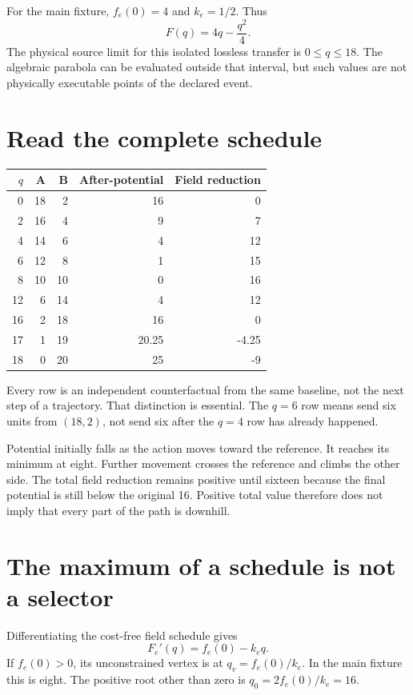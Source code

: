 For the main fixture, \(f_e(0)=4\) and \(k_e=1/2\). Thus
\begin{equation}\label{eq:main-finite-schedule}
 F(q)=4q-\frac{q^2}{4}.
\end{equation}
The physical source limit for this isolated lossless transfer is \(0\leq q\leq18\). The algebraic parabola can be evaluated outside that interval, but such values are not physically executable points of the declared event.

\section{Read the complete schedule}
\begin{center}
\begin{tabular}{rrrrr}
\toprule
\(q\) & A & B & After-potential & Field reduction\\
\midrule
0 & 18 & 2 & 16 & 0\\
2 & 16 & 4 & 9 & 7\\
4 & 14 & 6 & 4 & 12\\
6 & 12 & 8 & 1 & 15\\
8 & 10 & 10 & 0 & 16\\
12 & 6 & 14 & 4 & 12\\
16 & 2 & 18 & 16 & 0\\
17 & 1 & 19 & 20.25 & -4.25\\
18 & 0 & 20 & 25 & -9\\
\bottomrule
\end{tabular}
\end{center}
Every row is an independent counterfactual from the same baseline, not the next step of a trajectory. That distinction is essential. The \(q=6\) row means send six units from \((18,2)\), not send six after the \(q=4\) row has already happened.

Potential initially falls as the action moves toward the reference. It reaches its minimum at eight. Further movement crosses the reference and climbs the other side. The total field reduction remains positive until sixteen because the final potential is still below the original 16. Positive total value therefore does not imply that every part of the path is downhill.

\section{The maximum of a schedule is not a selector}
Differentiating the cost-free field schedule gives
\begin{equation}
 F_e'(q)=f_e(0)-k_e q.
\end{equation}
If \(f_e(0)>0\), its unconstrained vertex is at \(q_v=f_e(0)/k_e\). In the main fixture this is eight. The positive root other than zero is \(q_0=2f_e(0)/k_e=16\).

